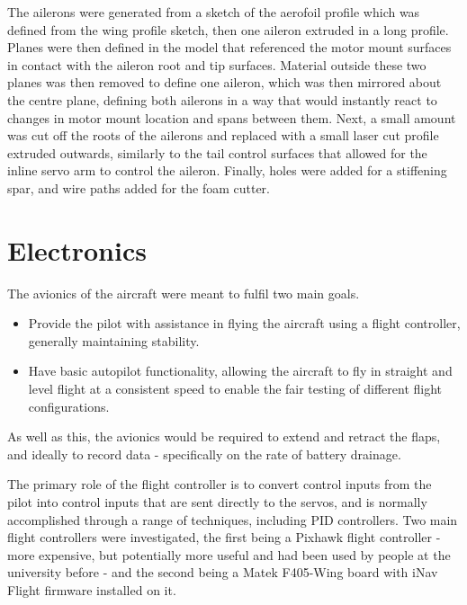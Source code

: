 \documentclass[../../main.tex]{subfiles}
\begin{document}
The ailerons were generated from a sketch of the aerofoil profile which was defined from the wing profile sketch, then one aileron extruded in a long profile.
Planes were then defined in the model that referenced the motor mount surfaces in contact with the aileron root and tip surfaces.
Material outside these two planes was then removed to define one aileron, which was then mirrored about the centre plane, defining both ailerons in a way that would instantly react to changes in motor mount location and spans between them.
Next, a small amount was cut off the roots of the ailerons and replaced with a small laser cut profile extruded outwards, similarly to the tail control surfaces that allowed for the inline servo arm to control the aileron.
Finally, holes were added for a stiffening spar, and wire paths added for the foam cutter. 


\section{Electronics} \label{sec:final-design-proposal:electronics}


The avionics of the aircraft were meant to fulfil two main goals.

\begin{itemize}
    \item Provide the pilot with assistance in flying the aircraft using a flight controller, generally maintaining stability. 
    \item Have basic autopilot functionality, allowing the aircraft to fly in straight and level flight at a consistent speed to enable the fair testing of different flight configurations. 
\end{itemize}

As well as this, the avionics would be required to extend and retract the flaps, and ideally to record data - specifically on the rate of battery drainage. 

The primary role of the flight controller is to convert control inputs from the pilot into control inputs that are sent directly to the servos, and is normally accomplished through a range of techniques, including PID controllers.
Two main flight controllers were investigated, the first being a Pixhawk flight controller - more expensive, but potentially more useful and had been used by people at the university before - and the second being a Matek F405-Wing board with iNav Flight firmware installed on it. 
\end{document}
